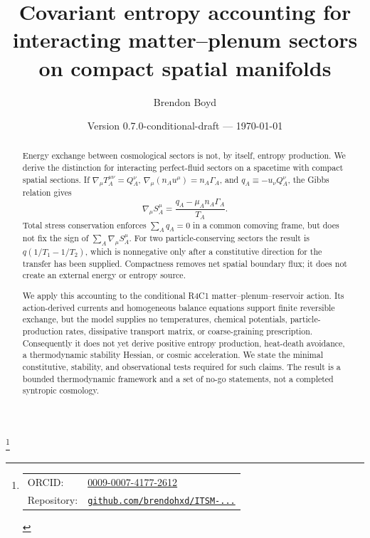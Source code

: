 \documentclass[aps,prd,reprint,superscriptaddress,nofootinbib,floatfix]{revtex4-2}
\begin{document}
\title{Covariant entropy accounting for interacting matter--plenum sectors
on compact spatial manifolds}

\author{Brendon Boyd}
\thanks{%
\begin{tabular}{@{}l@{\ }l@{}}
ORCID: & \href{https://orcid.org/0009-0007-4177-2612}{0009-0007-4177-2612} \\
Repository: & \href{https://github.com/brendohxd/ITSM-Integrated-Toroidal-Syntropic-Model}{\texttt{github.com/brendohxd/ITSM-...}} \\
\end{tabular}%
}

\date{Version 0.7.0-conditional-draft --- \today}

\begin{abstract}
Energy exchange between cosmological sectors is not, by itself, entropy
production.  We derive the distinction for interacting perfect-fluid sectors
on a spacetime with compact spatial sections.  If
\(\nabla_\mu T_A^{\mu\nu}=Q_A^\nu\),
\(\nabla_\mu(n_Au^\mu)=n_A\Gamma_A\), and
\(q_A\equiv-u_\nu Q_A^\nu\), the Gibbs relation gives
\[
 \nabla_\mu S_A^\mu
 =\frac{q_A-\mu_A n_A\Gamma_A}{T_A}.
\]
Total stress conservation enforces \(\sum_A q_A=0\) in a common comoving
frame, but does not fix the sign of \(\sum_A\nabla_\mu S_A^\mu\).
For two particle-conserving sectors the result is
\(q(1/T_1-1/T_2)\), which is nonnegative only after a constitutive direction
for the transfer has been supplied.  Compactness removes net spatial boundary
flux; it does not create an external energy or entropy source.

We apply this accounting to the conditional R4C1 matter--plenum--reservoir
action.  Its action-derived currents and homogeneous balance equations support
finite reversible exchange, but the model supplies no temperatures, chemical
potentials, particle-production rates, dissipative transport matrix, or
coarse-graining prescription.  Consequently it does not yet derive positive
entropy production, heat-death avoidance, a thermodynamic stability Hessian,
or cosmic acceleration.  We state the minimal constitutive, stability, and
observational tests required for such claims.  The result is a bounded
thermodynamic framework and a set of no-go statements, not a completed
syntropic cosmology.
\end{abstract}

\end{document}
